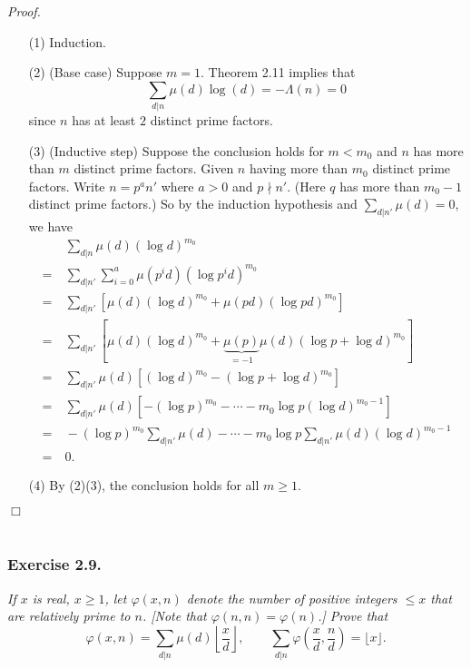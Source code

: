 \documentclass{article}
\begin{document}
\emph{Proof.}
\begin{enumerate}
\item[(1)]
  Induction.

\item[(2)]
  (Base case)
  Suppose $m = 1$.
  Theorem 2.11 implies that
  \[
    \sum_{d|n} \mu(d) \log(d) = - \Lambda(n) = 0
  \]
  since $n$ has at least $2$ distinct prime factors.

\item[(3)]
  (Inductive step)
  Suppose the conclusion holds for $m < m_0$ and $n$ has more than $m$ distinct prime factors.
  Given $n$ having more than $m_0$ distinct prime factors.
  Write $n = p^a n'$ where $a > 0$ and $p \nmid n'$.
  (Here $q$ has more than $m_0 - 1$ distinct prime factors.)
  So by the induction hypothesis and $\sum_{d|n'} \mu(d) = 0$,
  we have
  \begin{align*}
    &\:
    \sum_{d|n} \mu(d) (\log d)^{m_0} \\
    =&\: \sum_{d|n'} \sum_{i = 0}^{a} \mu(p^i d) (\log p^i d)^{m_0} \\
    =&\: \sum_{d|n'} [ \mu(d) (\log d)^{m_0} + \mu(pd) (\log pd)^{m_0} ] \\
    =&\: \sum_{d|n'} [ \mu(d) (\log d)^{m_0}
        + \underbrace{\mu(p)}_{= -1}\mu(d) (\log p + \log d)^{m_0} ] \\
    =&\: \sum_{d|n'} \mu(d) [ (\log d)^{m_0} - (\log p + \log d)^{m_0} ] \\
    =&\: \sum_{d|n'} \mu(d) [ - (\log p)^{m_0} - \cdots - m_0 \log p (\log d)^{m_0 - 1} ] \\
    =&\: - (\log p)^{m_0} \sum_{d|n'} \mu(d) - \cdots
        - m_0 \log p \sum_{d|n'} \mu(d) (\log d)^{m_0 - 1} \\
    =&\: 0.
  \end{align*}

\item[(4)]
  By (2)(3), the conclusion holds for all $m \geq 1$.
\end{enumerate}
$\Box$ \\\\






\subsubsection*{Exercise 2.9.}
\emph{If $x$ is real, $x \geq 1$, let $\varphi(x,n)$ denote
the number of positive integers $\leq x$ that are relatively prime to $n$.
[Note that $\varphi(n,n) = \varphi(n)$.]
Prove that
\[
  \varphi(x,n) = \sum_{d|n} \mu(d) \left\lfloor \frac{x}{d} \right\rfloor,
  \qquad
  \sum_{d|n} \varphi\left( \frac{x}{d},\frac{n}{d} \right) = \lfloor x \rfloor.
\]}
\end{document}
